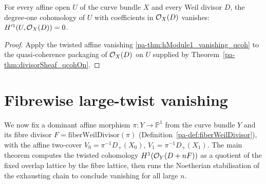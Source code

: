 \begin{theorem}
  \label{pa-thm:subsingleton_hModule_divisorSheaf_one}
  \leanok

  For every affine open \(U\) of the curve bundle \(X\) and every Weil divisor \(D\), the
  degree-one cohomology of \(U\) with coefficients in \(\mathcal{O}_{X}(D)\) vanishes: \(H'^1(U, \mathcal{O}_{X}(D)) = 0\).
\end{theorem}
\begin{proof}
  \leanok
  Apply the twisted affine vanishing \ref{pa-thm:hModule1_vanishing_qcoh} to the quasi-coherence
  packaging of \(\mathcal{O}_{X}(D)\) on \(U\) supplied by Theorem~\ref{pa-thm:divisorSheaf_qcohOn}.
\end{proof}

\section{Fibrewise large-twist vanishing}

We now fix a dominant affine morphism \(\pi \colon Y \to \mathbb P^1\) from the curve bundle \(Y\)
and its fibre divisor \(F = \mathrm{fiberWeilDivisor}(\pi)\) (Definition~\ref{pa-def:fiberWeilDivisor}),
with the affine two-cover \(V_0 = \pi^{-1}D_+(X_0)\), \(V_1 = \pi^{-1}D_+(X_1)\). The main theorem
computes the twisted cohomology \(H^1(\mathcal{O}_{Y}(D + nF))\) as a quotient of the fixed overlap
lattice by the fibre lattice, then runs the Noetherian stabilisation of the exhausting chain to
conclude vanishing for all large \(n\).

